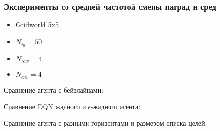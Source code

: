 \documentclass[a4paper]{article}
\begin{document}
  

  

\subsubsection{Эксперименты со средней частотой смены наград и сред}

\begin{itemize}
  \item Gridworld 5x5
  \item $N_{s_0} = 50$
  \item $N_{rew} = 4$
  \item $N_{env} = 4$
\end{itemize}

Сравнение агента с бейзлайнами:


Сравнение DQN жадного и $\epsilon$-жадного агента:


Сравнение агента с разными горизонтами и размером списка целей:
\end{document}
